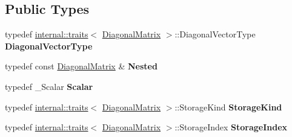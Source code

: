 \subsection*{Public Types}
\begin{DoxyCompactItemize}
\item 
\mbox{\label{class_eigen_1_1_diagonal_matrix_a15bb0b30b931772c81d558207dd3804b}} 
typedef \mbox{\hyperlink{struct_eigen_1_1internal_1_1traits}{internal\+::traits}}$<$ \mbox{\hyperlink{class_eigen_1_1_diagonal_matrix}{Diagonal\+Matrix}} $>$\+::Diagonal\+Vector\+Type {\bfseries Diagonal\+Vector\+Type}
\item 
\mbox{\label{class_eigen_1_1_diagonal_matrix_aed13866129663f9ad9e8efd5bd10ece7}} 
typedef const \mbox{\hyperlink{class_eigen_1_1_diagonal_matrix}{Diagonal\+Matrix}} \& {\bfseries Nested}
\item 
\mbox{\label{class_eigen_1_1_diagonal_matrix_a927965f00d816212b6651b1f6bce783d}} 
typedef \+\_\+\+Scalar {\bfseries Scalar}
\item 
\mbox{\label{class_eigen_1_1_diagonal_matrix_ac61c867d48e814e1f90ae8b3ad73ae1b}} 
typedef \mbox{\hyperlink{struct_eigen_1_1internal_1_1traits}{internal\+::traits}}$<$ \mbox{\hyperlink{class_eigen_1_1_diagonal_matrix}{Diagonal\+Matrix}} $>$\+::Storage\+Kind {\bfseries Storage\+Kind}
\item 
\mbox{\label{class_eigen_1_1_diagonal_matrix_aaebe61dfe47cc30064d8daaee8092d62}} 
typedef \mbox{\hyperlink{struct_eigen_1_1internal_1_1traits}{internal\+::traits}}$<$ \mbox{\hyperlink{class_eigen_1_1_diagonal_matrix}{Diagonal\+Matrix}} $>$\+::Storage\+Index {\bfseries Storage\+Index}
\end{DoxyCompactItemize}
